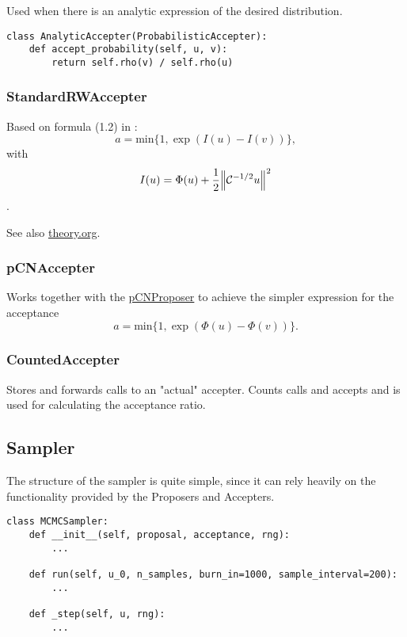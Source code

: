\documentclass[11pt]{article}
\newcommand{\C}{{\mathcal{C}}}
\begin{document}
Used when there is an analytic expression of the desired distribution.

\begin{verbatim}
class AnalyticAccepter(ProbabilisticAccepter):
    def accept_probability(self, u, v):
        return self.rho(v) / self.rho(u)
\end{verbatim}

\subsubsection{StandardRWAccepter}
\label{sec:org1c28009}

Based on formula (1.2) in \cite{cotter_mcmc_2013}:
$$a = \text{min}\{1, \exp(I(u) - I(v))\},$$ with
$$I(u) = \Phi(u) + \frac{1}{2}\norm{\C^{-1/2}u}^2$$.

See also \url{theory.org}.

\subsubsection{pCNAccepter}
\label{sec:org5d9cea2}

Works together with the \hyperref[sec:orgcfd532b]{pCNProposer} to achieve the simpler expression for the acceptance
$$a = \text{min}\{1, \exp(\Phi(u) - \Phi(v))\}.$$

\subsubsection{CountedAccepter}
\label{sec:org36d9265}

Stores and forwards calls to an "actual" accepter. Counts calls and accepts and is used for
calculating the acceptance ratio.

\subsection{Sampler}
\label{sec:org43db2a4}

The structure of the sampler is quite simple, since it can rely heavily on the functionality
provided by the Proposers and Accepters.

\begin{verbatim}
class MCMCSampler:
    def __init__(self, proposal, acceptance, rng):
        ...

    def run(self, u_0, n_samples, burn_in=1000, sample_interval=200):
        ...

    def _step(self, u, rng):
        ...
\end{verbatim}
\end{document}
